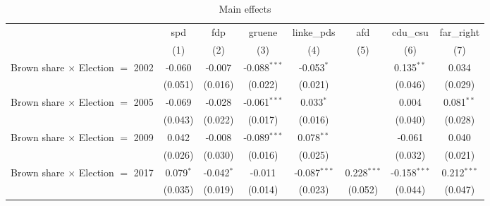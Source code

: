 
\begin{table}[htbp]
   \caption{Main effects}
   \centering
   \begin{tabular}{lccccccc}
      \tabularnewline \midrule \midrule
                                                              & spd                  & fdp                   & gruene                & linke\_pds     & afd            & cdu\_csu       & far\_right\\   
                                                              & (1)                  & (2)                   & (3)                   & (4)            & (5)            & (6)            & (7)\\  
      Brown share $\times$ Election $=$ 2002                  & -0.060               & -0.007                & -0.088$^{***}$        & -0.053$^{*}$   &                & 0.135$^{**}$   & 0.034\\   
                                                              & (0.051)              & (0.016)               & (0.022)               & (0.021)        &                & (0.046)        & (0.029)\\   
      Brown share $\times$ Election $=$ 2005                  & -0.069               & -0.028                & -0.061$^{***}$        & 0.033$^{*}$    &                & 0.004          & 0.081$^{**}$\\   
                                                              & (0.043)              & (0.022)               & (0.017)               & (0.016)        &                & (0.040)        & (0.028)\\   
      Brown share $\times$ Election $=$ 2009                  & 0.042                & -0.008                & -0.089$^{***}$        & 0.078$^{**}$   &                & -0.061         & 0.040\\   
                                                              & (0.026)              & (0.030)               & (0.016)               & (0.025)        &                & (0.032)        & (0.021)\\   
      Brown share $\times$ Election $=$ 2017                  & 0.079$^{*}$          & -0.042$^{*}$          & -0.011                & -0.087$^{***}$ & 0.228$^{***}$  & -0.158$^{***}$ & 0.212$^{***}$\\   
                                                              & (0.035)              & (0.019)               & (0.014)               & (0.023)        & (0.052)        & (0.044)        & (0.047)\\   

\end{tabular}
\end{table}
